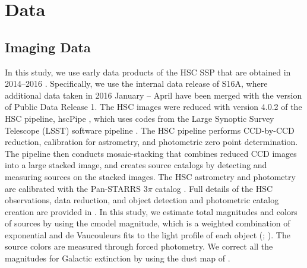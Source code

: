 \documentclass[]{pasj01}
\begin{document}
\section{Data} \label{sec:data}

\subsection{Imaging Data} \label{sec:imaging_data}


 
In this study, 
we use early data products of the HSC SSP that are obtained in 2014--2016 
\citep{2017arXiv170208449A}. 
Specifically, 
we use the internal data release of S16A, 
where additional data taken in 2016 January -- April have been merged with 
the version of Public Data Release 1. 
The HSC images were reduced with 
version 4.0.2 of the HSC pipeline, hscPipe \citep{2017arXiv170506766B},
which uses codes from the Large Synoptic Survey Telescope (LSST) software pipeline 
\citep{2008arXiv0805.2366I,2010SPIE.7740E..15A,2015arXiv151207914J}. 
The HSC pipeline performs 
CCD-by-CCD reduction, calibration for astrometry, and photometric zero point determination. 
The pipeline then conducts  
mosaic-stacking that combines reduced CCD images into a large stacked image, 
and 
creates source catalogs by detecting and measuring sources on the stacked images. 
The HSC astrometry and photometry are calibrated with 
the Pan-STARRS $3\pi$ catalog 
\citep{2012ApJ...750...99T,2012ApJ...756..158S,2013ApJS..205...20M}. 
Full details of the HSC observations, data reduction,  
and object detection and photometric catalog creation 
are provided in \citet{2017arXiv170208449A}. 
In this study, we estimate total magnitudes and colors of sources 
by using the cmodel magnitude,  
which is a weighted combination of exponential and de Vaucouleurs fits 
to the light profile of each object 
(\cite{2004AJ....128..502A}; \cite{2017arXiv170506766B}). 
The source colors are measured through forced photometry. 
We correct all the magnitudes for Galactic extinction 
by using the dust map of \citet{1998ApJ...500..525S}.
\end{document}
